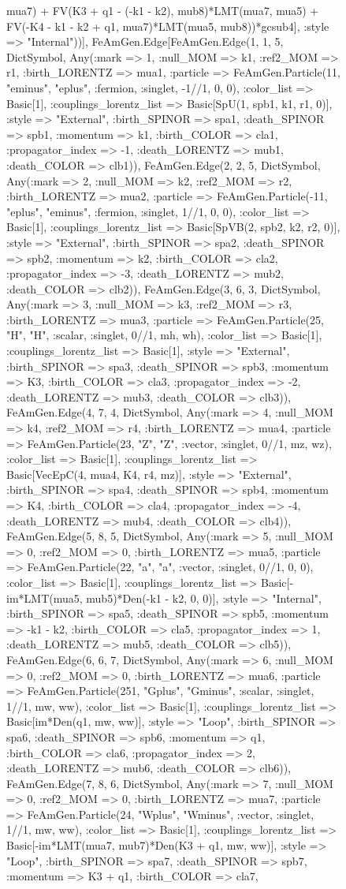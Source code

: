 \documentclass{revtex4}
\begin{document}
\begin{figure}[!htb]
\begin{center}
{mua7) + FV(K3 + q1 - (-k1 - k2), mub8)*LMT(mua7, mua5) + FV(-K4 - k1 - k2 + q1, mua7)*LMT(mua5, mub8))*gcsub4], :style => "Internal"))], FeAmGen.Edge[FeAmGen.Edge(1, 1, 5, Dict{Symbol, Any}(:mark => 1, :null_MOM => k1, :ref2_MOM => r1, :birth_LORENTZ => mua1, :particle => FeAmGen.Particle(11, "eminus", "eplus", :fermion, :singlet, -1//1, 0, 0), :color_list => Basic[1], :couplings_lorentz_list => Basic[SpU(1, spb1, k1, r1, 0)], :style => "External", :birth_SPINOR => spa1, :death_SPINOR => spb1, :momentum => k1, :birth_COLOR => cla1, :propagator_index => -1, :death_LORENTZ => mub1, :death_COLOR => clb1)), FeAmGen.Edge(2, 2, 5, Dict{Symbol, Any}(:mark => 2, :null_MOM => k2, :ref2_MOM => r2, :birth_LORENTZ => mua2, :particle => FeAmGen.Particle(-11, "eplus", "eminus", :fermion, :singlet, 1//1, 0, 0), :color_list => Basic[1], :couplings_lorentz_list => Basic[SpVB(2, spb2, k2, r2, 0)], :style => "External", :birth_SPINOR => spa2, :death_SPINOR => spb2, :momentum => k2, :birth_COLOR => cla2, :propagator_index => -3, :death_LORENTZ => mub2, :death_COLOR => clb2)), FeAmGen.Edge(3, 6, 3, Dict{Symbol, Any}(:mark => 3, :null_MOM => k3, :ref2_MOM => r3, :birth_LORENTZ => mua3, :particle => FeAmGen.Particle(25, "H", "H", :scalar, :singlet, 0//1, mh, wh), :color_list => Basic[1], :couplings_lorentz_list => Basic[1], :style => "External", :birth_SPINOR => spa3, :death_SPINOR => spb3, :momentum => K3, :birth_COLOR => cla3, :propagator_index => -2, :death_LORENTZ => mub3, :death_COLOR => clb3)), FeAmGen.Edge(4, 7, 4, Dict{Symbol, Any}(:mark => 4, :null_MOM => k4, :ref2_MOM => r4, :birth_LORENTZ => mua4, :particle => FeAmGen.Particle(23, "Z", "Z", :vector, :singlet, 0//1, mz, wz), :color_list => Basic[1], :couplings_lorentz_list => Basic[VecEpC(4, mua4, K4, r4, mz)], :style => "External", :birth_SPINOR => spa4, :death_SPINOR => spb4, :momentum => K4, :birth_COLOR => cla4, :propagator_index => -4, :death_LORENTZ => mub4, :death_COLOR => clb4)), FeAmGen.Edge(5, 8, 5, Dict{Symbol, Any}(:mark => 5, :null_MOM => 0, :ref2_MOM => 0, :birth_LORENTZ => mua5, :particle => FeAmGen.Particle(22, "a", "a", :vector, :singlet, 0//1, 0, 0), :color_list => Basic[1], :couplings_lorentz_list => Basic[-im*LMT(mua5, mub5)*Den(-k1 - k2, 0, 0)], :style => "Internal", :birth_SPINOR => spa5, :death_SPINOR => spb5, :momentum => -k1 - k2, :birth_COLOR => cla5, :propagator_index => 1, :death_LORENTZ => mub5, :death_COLOR => clb5)), FeAmGen.Edge(6, 6, 7, Dict{Symbol, Any}(:mark => 6, :null_MOM => 0, :ref2_MOM => 0, :birth_LORENTZ => mua6, :particle => FeAmGen.Particle(251, "Gplus", "Gminus", :scalar, :singlet, 1//1, mw, ww), :color_list => Basic[1], :couplings_lorentz_list => Basic[im*Den(q1, mw, ww)], :style => "Loop", :birth_SPINOR => spa6, :death_SPINOR => spb6, :momentum => q1, :birth_COLOR => cla6, :propagator_index => 2, :death_LORENTZ => mub6, :death_COLOR => clb6)), FeAmGen.Edge(7, 8, 6, Dict{Symbol, Any}(:mark => 7, :null_MOM => 0, :ref2_MOM => 0, :birth_LORENTZ => mua7, :particle => FeAmGen.Particle(24, "Wplus", "Wminus", :vector, :singlet, 1//1, mw, ww), :color_list => Basic[1], :couplings_lorentz_list => Basic[-im*LMT(mua7, mub7)*Den(K3 + q1, mw, ww)], :style => "Loop", :birth_SPINOR => spa7, :death_SPINOR => spb7, :momentum => K3 + q1, :birth_COLOR => cla7, }
\end{center}
\end{figure}
\end{document}
